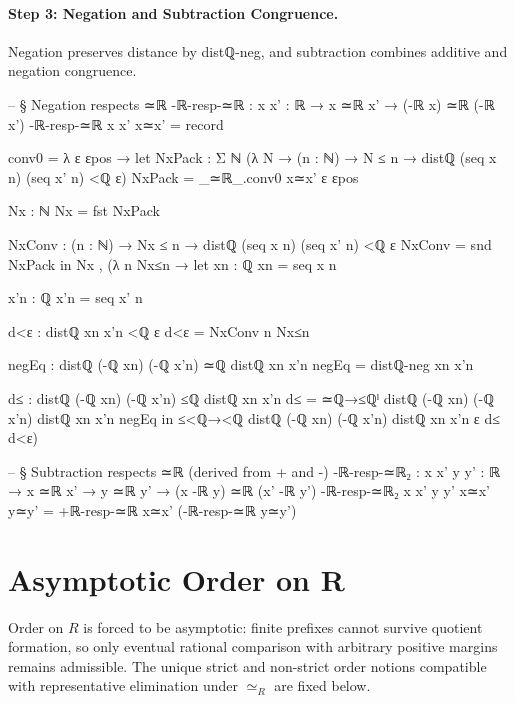 \documentclass[11pt,a4paper]{book}
\def\mathbb#1{#1}%
\def\texttt#1{#1}%
\def\texorpdfstring#1#2{#2}%
\begin{document}
\paragraph{Step 3: Negation and Subtraction Congruence.}
Negation preserves distance by \texttt{distℚ-neg}, and subtraction
combines additive and negation congruence.

\begin{code}
-- § Negation respects ≃ℝ
-ℝ-resp-≃ℝ : {x x' : ℝ} → x ≃ℝ x' → (-ℝ x) ≃ℝ (-ℝ x')
-ℝ-resp-≃ℝ {x} {x'} x≃x' = record
  { conv0 = λ ε εpos →
      let
        NxPack : Σ ℕ (λ N → (n : ℕ) → N ≤ n → distℚ (seq x n) (seq x' n) <ℚ ε)
        NxPack = _≃ℝ_.conv0 x≃x' ε εpos

        Nx : ℕ
        Nx = fst NxPack

        NxConv : (n : ℕ) → Nx ≤ n → distℚ (seq x n) (seq x' n) <ℚ ε
        NxConv = snd NxPack
      in
      Nx , (λ n Nx≤n →
        let
          xn : ℚ
          xn = seq x n

          x'n : ℚ
          x'n = seq x' n

          d<ε : distℚ xn x'n <ℚ ε
          d<ε = NxConv n Nx≤n

          negEq : distℚ (-ℚ xn) (-ℚ x'n) ≃ℚ distℚ xn x'n
          negEq = distℚ-neg xn x'n

          d≤ : distℚ (-ℚ xn) (-ℚ x'n) ≤ℚ distℚ xn x'n
          d≤ = ≃ℚ→≤ℚˡ {distℚ (-ℚ xn) (-ℚ x'n)} {distℚ xn x'n} negEq
        in
        ≤<ℚ→<ℚ {distℚ (-ℚ xn) (-ℚ x'n)} {distℚ xn x'n} {ε} d≤ d<ε)
  }

-- § Subtraction respects ≃ℝ (derived from + and -)
-ℝ-resp-≃ℝ₂ : {x x' y y' : ℝ} → x ≃ℝ x' → y ≃ℝ y' → (x -ℝ y) ≃ℝ (x' -ℝ y')
-ℝ-resp-≃ℝ₂ {x} {x'} {y} {y'} x≃x' y≃y' =
  +ℝ-resp-≃ℝ x≃x' (-ℝ-resp-≃ℝ y≃y')
\end{code}


\section{Asymptotic Order on \texorpdfstring{$\mathbb{R}$}{R}}

Order on $\mathbb{R}$ is forced to be asymptotic: finite prefixes cannot survive quotient formation, so only eventual rational comparison with arbitrary positive margins remains admissible. The unique strict and non-strict order notions compatible with representative elimination under $\simeq_{\mathbb{R}}$ are fixed below.
\end{document}
